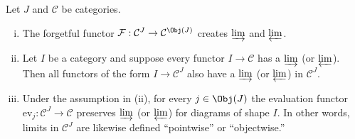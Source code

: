 \begin{proposition}\label{prop:forget-create}
	Let $J$ and $\mathcal{C}$ be categories.
	\begin{enumerate}[(i)]
		\item The forgetful functor
		$\mathcal{F}: \mathcal{C}^J \to \mathcal{C}^{\Obj(J)}$ creates
		$\varinjlim$ and $\varprojlim$.
		\item Let $I$ be a category and suppose every functor
		$I \to \mathcal{C}$ has a $\varinjlim$ (or $\varprojlim$). Then all
		functors of the form $I \to \mathcal{C}^J$ also have a $\varinjlim$ (or
		$\varprojlim$) in $\mathcal{C}^J$.
		\item Under the assumption in (ii), for every $j \in \Obj(J)$ the
		evaluation functor $\mathrm{ev}_j: \mathcal{C}^J \to \mathcal{C}$
		preserves $\varinjlim$ (or $\varprojlim$) for diagrams of shape $I$.
		In other words, limits in $\mathcal{C}^J$ are likewise defined
		``pointwise'' or ``objectwise.''
	\end{enumerate}
\end{proposition}
